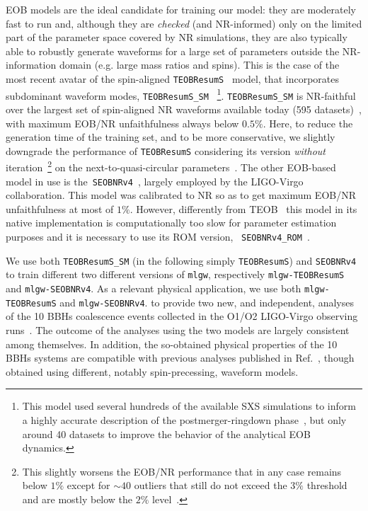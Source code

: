 \documentclass[twocolumn,showpacs,preprintnumbers,nofootinbib,prd,
superscriptaddress,10pt]{revtex4-1}
\begin{document}
EOB models are the ideal candidate for training our model: they are moderately fast to run 
and, although they are {\it checked} (and NR-informed) only on the limited part of the 
parameter space covered by NR simulations,  they are also typically able to robustly 
generate waveforms for a large set of parameters outside the NR-information 
domain (e.g. large mass ratios and spins).
This is the case of the most recent avatar of the spin-aligned \texttt{TEOBResumS}~\cite{Nagar:2018zoe} 
model, that incorporates subdominant waveform modes, \texttt{TEOBResumS\_SM}~\cite{Nagar:2019wds,Nagar:2020pcj}
\footnote{This model used several hundreds of the available SXS simulations to inform a highly 
accurate description of the postmerger-ringdown phase~\cite{Damour:2014yha}, but 
only around 40 datasets to improve the behavior of the analytical EOB dynamics.}.
\texttt{TEOBResumS\_SM} is NR-faithful over the largest set of spin-aligned NR waveforms 
available today (595 datasets)~\cite{Nagar:2020pcj}, with maximum EOB/NR unfaithfulness 
always below $0.5\%$. Here, to reduce the generation time of the training set, and to be more 
conservative, we slightly downgrade the performance of \texttt{TEOBResumS} considering 
its version {\it without} iteration~\footnote{This slightly worsens the EOB/NR performance that in
any case remains below $1\%$ except for $\sim 40$ outliers that still do not exceed the $3\%$ 
threshold and are mostly below the $2\%$ level~\cite{Riemenschneider:2020}.} on 
the next-to-quasi-circular parameters~\cite{Nagar:2020pcj}.
The other EOB-based model in use is the~\texttt{SEOBNRv4}~\cite{Taracchini:2013rva,Bohe:2016gbl},
largely employed by the LIGO-Virgo collaboration. This model was calibrated to NR so as to get  
maximum EOB/NR unfaithfulness at most of $1\%$. However, differently from 
TEOB~\cite{Nagar:2018zoe} this model in its native implementation is computationally 
too slow for parameter estimation purposes and it is necessary 
to use its ROM version, ~\texttt{SEOBNRv4\_ROM}~\cite{Bohe:2016gbl}.

We use both \texttt{TEOBResumS\_SM} (in the following simply \texttt{TEOBResumS}) 
and \texttt{SEOBNRv4} to train different two different versions of \texttt{mlgw}, respectively
\texttt{mlgw-TEOBResumS} and \texttt{mlgw-SEOBNRv4}.
As a relevant physical application, we use both 
\texttt{mlgw-TEOBResumS} and \texttt{mlgw-SEOBNRv4}.
to provide two new, and independent, analyses of the 10 BBHs 
coalescence events collected in the O1/O2 LIGO-Virgo observing 
runs~\cite{LIGOScientific:2018mvr}. The outcome of the analyses 
using the two models are largely consistent among themselves.
In addition,  the so-obtained physical properties of the 10 BBHs
systems are compatible with previous analyses published in
Ref.~\cite{LIGOScientific:2018mvr}, though obtained using
different, notably spin-precessing, waveform models.
\end{document}
